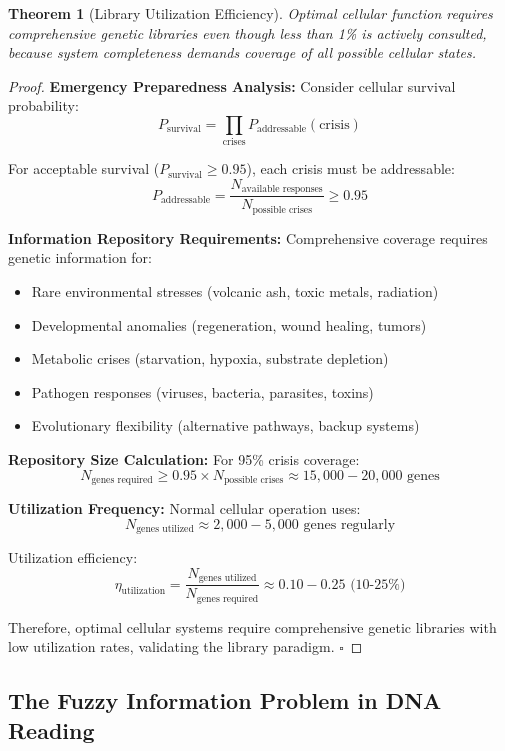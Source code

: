 \documentclass[12pt,a4paper]{article}
\newtheorem{theorem}{Theorem}[section]
\begin{document}
\begin{theorem}[Library Utilization Efficiency]
Optimal cellular function requires comprehensive genetic libraries even though less than 1\% is actively consulted, because system completeness demands coverage of all possible cellular states.
\end{theorem}

\begin{proof}
\textbf{Emergency Preparedness Analysis:}
Consider cellular survival probability:
$$P_{\text{survival}} = \prod_{\text{crises}} P_{\text{addressable}}(\text{crisis})$$

For acceptable survival ($P_{\text{survival}} \geq 0.95$), each crisis must be addressable:
$$P_{\text{addressable}} = \frac{N_{\text{available responses}}}{N_{\text{possible crises}}} \geq 0.95$$

\textbf{Information Repository Requirements:}
Comprehensive coverage requires genetic information for:
\begin{itemize}
\item Rare environmental stresses (volcanic ash, toxic metals, radiation)
\item Developmental anomalies (regeneration, wound healing, tumors)
\item Metabolic crises (starvation, hypoxia, substrate depletion)
\item Pathogen responses (viruses, bacteria, parasites, toxins)
\item Evolutionary flexibility (alternative pathways, backup systems)
\end{itemize}

\textbf{Repository Size Calculation:}
For 95\% crisis coverage:
$$N_{\text{genes required}} \geq 0.95 \times N_{\text{possible crises}} \approx 15,000-20,000 \text{ genes}$$

\textbf{Utilization Frequency:}
Normal cellular operation uses:
$$N_{\text{genes utilized}} \approx 2,000-5,000 \text{ genes regularly}$$

Utilization efficiency:
$$\eta_{\text{utilization}} = \frac{N_{\text{genes utilized}}}{N_{\text{genes required}}} \approx 0.10-0.25 \text{ (10-25\%)}$$

Therefore, optimal cellular systems require comprehensive genetic libraries with low utilization rates, validating the library paradigm. $\square$
\end{proof}

\subsection{The Fuzzy Information Problem in DNA Reading}
\end{document}
